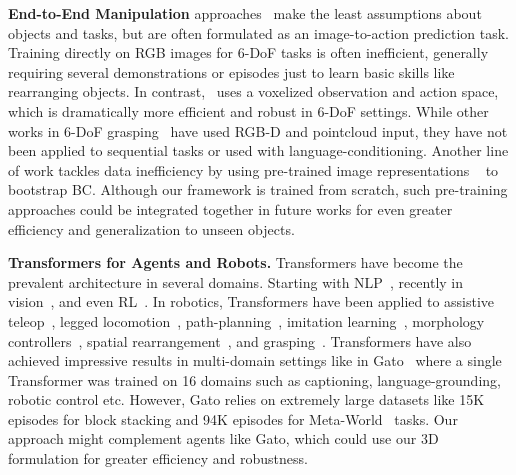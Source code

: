 \textbf{End-to-End Manipulation} approaches~\citep{kalashnikov2018qt,Wu-RSS-20,levine2016end,finn2017deep} make the least assumptions about objects and tasks, but are often formulated as an image-to-action prediction task. Training directly on RGB images for 6-DoF tasks is often inefficient, generally requiring several  demonstrations or episodes just to learn basic skills like rearranging objects. In contrast, \model~uses a voxelized observation and action space, which is dramatically more efficient and robust in 6-DoF settings.
While other works in 6-DoF grasping~\citep{song2020grasping,murali20206,mousavian20196,xu2022umpnet,agrawal2021scene,simeonov2021neural} have used RGB-D and pointcloud input, they have not been applied to sequential tasks or used with language-conditioning.
Another line of work tackles data inefficiency by using pre-trained image representations ~\citep{cliport,nair2022r3m,yuan2021sornet} to bootstrap BC. Although our framework is trained from scratch, such pre-training approaches could be integrated together in future works for even greater efficiency and generalization to unseen objects. 

\textbf{Transformers for Agents and Robots.} Transformers have become the prevalent architecture in several domains. Starting with NLP~\citep{vaswani2017attention,brown2020language,liu2019roberta}, recently in vision~\citep{dosovitskiy2020image,liu2021swin}, and even RL~\citep{chen2021decision,janner2021offline,lee2022multi}. In robotics, Transformers have been applied to assistive teleop~\citep{clever2021assistive},  legged locomotion~\citep{yang2021learning},  path-planning~\citep{chaplot2021differentiable,johnson2021motion}, imitation learning~\citep{dasari2020transformers,kim2021transformer}, morphology controllers~\citep{gupta2022metamorph}, spatial rearrangement~\citep{liu2022structformer}, and grasping~\citep{han2021learning}. Transformers have also achieved impressive results in multi-domain settings like in Gato~\cite{reed2022generalist} where a single Transformer was trained on 16 domains such as captioning, language-grounding, robotic control etc. However, Gato relies on extremely large datasets like 15K episodes for block stacking and 94K episodes for Meta-World~\citep{yu2020meta} tasks. Our approach might complement agents like Gato, which could use our 3D formulation for greater efficiency and robustness. 

